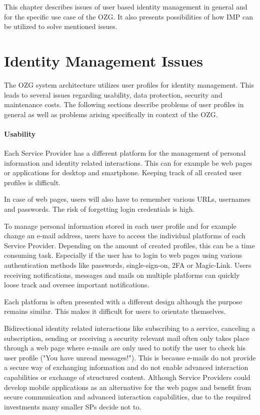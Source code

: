 This chapter describes issues of user based identity management in general and for the specific use case of the OZG. It also presents possibilities of how IMP can be utilized to solve mentioned issues.

\section{Identity Management Issues} \label{section:identity_management_issues}

The OZG system architecture utilizes user profiles for identity management. This leads to several issues regarding usability, data protection, security and maintenance costs. The following sections describe problems of user profiles in general as well as problems arising specifically in context of the OZG.

\paragraph{Usability}
Each Service Provider has a different platform for the management of personal information and identity related interactions. This can for example be web pages or applications for desktop and smartphone. Keeping track of all created user profiles is difficult.

In case of web pages, users will also have to remember various URLs, usernames and passwords. The risk of forgetting login credentials is high.

To manage personal information stored in each user profile and for example change an e-mail address, users have to access the individual platforms of each Service Provider. Depending on the amount of created profiles, this can be a time consuming task. Especially if the user has to login to web pages using various authentication methods like passwords, single-sign-on, 2FA or Magic-Link. Users receiving notifications, messages and mails on multiple platforms can quickly loose track and oversee important notifications.

Each platform is often presented with a different design although the purpose remains similar. This makes it difficult for users to orientate themselves.

Bidirectional identity related interactions like subscribing to a service, canceling a subscription, sending or receiving a security relevant mail often only takes place through a web page where e-mails are only used to notify the user to check his user profile ("You have unread messages!"). This is because e-mails do not provide a secure way of exchanging information and do not enable advanced interaction capabilities or exchange of structured content. Although Service Providers could develop mobile applications as an alternative for the web pages and benefit from secure communication and advanced interaction capabilities, due to the required investments many smaller SPs decide not to.

